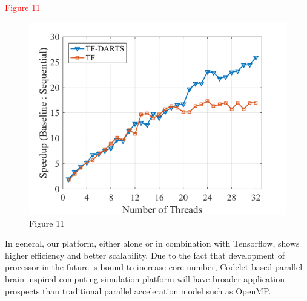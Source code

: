 \textcolor{red}{Figure 11}
\begin{figure}[h]
\caption{Figure 11}
\centering
\includegraphics[width=1\textwidth]{Fig/figure11.png}
\end{figure}
In general, our platform, either alone or in combination with Tensorflow, shows higher efficiency and better scalability. Due to the fact that development of processor in the future is bound to increase core number, Codelet-based parallel brain-inspired computing simulation platform will have broader application prospects than traditional parallel acceleration model such as OpenMP.

